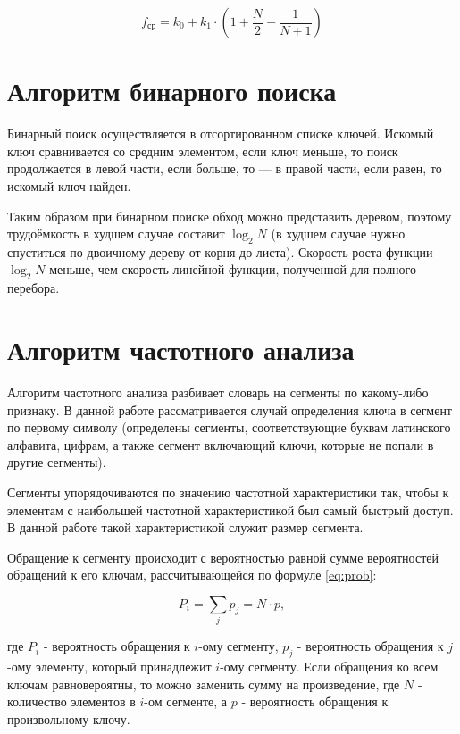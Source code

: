 \begin{equation}\label{eq:brute}
    f_{\text{ср}}= k_0 + k_1 \cdot (1 + \frac{N}{2} - \frac{1}{N + 1})
\end{equation}

\section{Алгоритм бинарного поиска}

Бинарный поиск \cite{McConnel} осуществляется в отсортированном списке ключей.
Искомый ключ сравнивается со средним элементом, если ключ меньше, то поиск
продолжается в левой части, если больше, то --- в правой части, если равен, то
искомый ключ найден.

Таким образом при бинарном поиске \cite{McConnel} обход можно представить
деревом, поэтому трудоёмкость в худшем случае составит $\log_2 N$ (в худшем
случае нужно спуститься по двоичному дереву от корня до листа). Скорость роста
функции $\log_2 N$ меньше, чем скорость линейной функции, полученной для
полного перебора.

\section{Алгоритм частотного анализа}

Алгоритм частотного анализа разбивает словарь на сегменты по какому-либо
признаку. В данной работе рассматривается случай определения ключа в сегмент
по первому символу (определены сегменты, соответствующие буквам латинского
алфавита, цифрам, а также сегмент включающий ключи, которые не попали в
другие сегменты).

Сегменты упорядочиваются по значению частотной характеристики так, чтобы к
элементам с наибольшей частотной характеристикой был самый быстрый доступ.
В данной работе такой характеристикой служит размер сегмента.

Обращение к сегменту происходит с вероятностью равной сумме вероятностей
обращений к его ключам, рассчитывающейся по формуле \ref{eq:prob}:

\begin{equation}\label{eq:prob}
    P_i = \sum_{j}p_j = N \cdot p,
\end{equation}

где $P_i$ - вероятность обращения к $i$-ому сегменту, $p_j$ - вероятность
обращения к $j$-ому элементу, который принадлежит $i$-ому сегменту. Если
обращения ко всем ключам равновероятны, то можно заменить сумму на
произведение, где $N$ - количество элементов в $i$-ом сегменте, а $p$ -
вероятность обращения к произвольному ключу.

